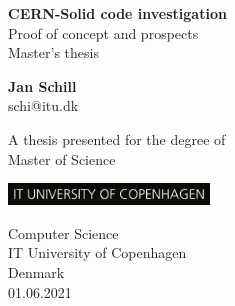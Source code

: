 \documentclass[runningheads]{llncs}
\begin{document}
\begin{titlepage}
   \begin{center}
       \vspace*{1cm}
       \Huge
       \textbf{CERN-Solid code investigation}\\
       \LARGE
       \vspace{0.5cm}
        Proof of concept and prospects\\
       \vspace{1cm}
       \large
       Master’s thesis
       \vspace{1cm}
        \LARGE
       

       \textbf{Jan Schill}\\
       schi@itu.dk

       \vfill
            
      A thesis presented for the degree of\\
      Master of Science
            
       \vspace{0.8cm}
     
       \includegraphics[width=0.4\textwidth]{assets/university.jpg}
    
       \Large
       Computer Science\\
       IT University of Copenhagen\\
       Denmark\\
       01.06.2021
            
   \end{center}
\end{titlepage}


\tableofcontents
\newpage





\printglossary[type=\acronymtype]

\newpage
\printbibliography
\end{document}
